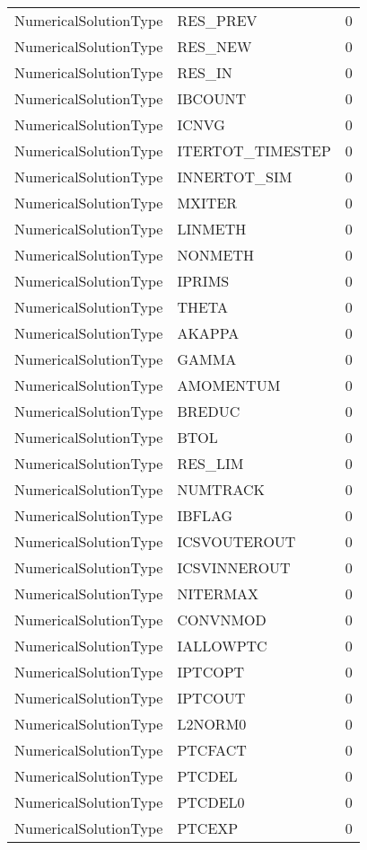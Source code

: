 \begin{longtable}{p{6cm} p{4cm} p{2cm} }
NumericalSolutionType &  RES\_PREV & 0 \\ 
NumericalSolutionType &  RES\_NEW & 0 \\ 
NumericalSolutionType &  RES\_IN & 0 \\ 
NumericalSolutionType &  IBCOUNT & 0 \\ 
NumericalSolutionType &  ICNVG & 0 \\ 
NumericalSolutionType &  ITERTOT\_TIMESTEP & 0 \\ 
NumericalSolutionType &  INNERTOT\_SIM & 0 \\ 
NumericalSolutionType &  MXITER & 0 \\ 
NumericalSolutionType &  LINMETH & 0 \\ 
NumericalSolutionType &  NONMETH & 0 \\ 
NumericalSolutionType &  IPRIMS & 0 \\ 
NumericalSolutionType &  THETA & 0 \\ 
NumericalSolutionType &  AKAPPA & 0 \\ 
NumericalSolutionType &  GAMMA & 0 \\ 
NumericalSolutionType &  AMOMENTUM & 0 \\ 
NumericalSolutionType &  BREDUC & 0 \\ 
NumericalSolutionType &  BTOL & 0 \\ 
NumericalSolutionType &  RES\_LIM & 0 \\ 
NumericalSolutionType &  NUMTRACK & 0 \\ 
NumericalSolutionType &  IBFLAG & 0 \\ 
NumericalSolutionType &  ICSVOUTEROUT & 0 \\ 
NumericalSolutionType &  ICSVINNEROUT & 0 \\ 
NumericalSolutionType &  NITERMAX & 0 \\ 
NumericalSolutionType &  CONVNMOD & 0 \\ 
NumericalSolutionType &  IALLOWPTC & 0 \\ 
NumericalSolutionType &  IPTCOPT & 0 \\ 
NumericalSolutionType &  IPTCOUT & 0 \\ 
NumericalSolutionType &  L2NORM0 & 0 \\ 
NumericalSolutionType &  PTCFACT & 0 \\ 
NumericalSolutionType &  PTCDEL & 0 \\ 
NumericalSolutionType &  PTCDEL0 & 0 \\ 
NumericalSolutionType &  PTCEXP & 0 \\ 

\end{longtable}
